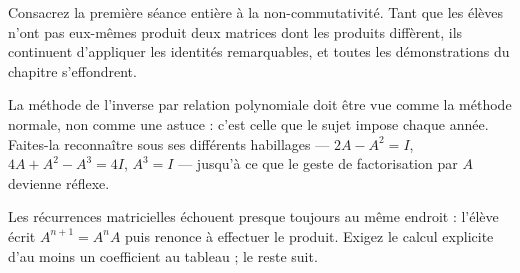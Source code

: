 \begin{notepourlaclasse}
Consacrez la première séance entière à la non-commutativité. Tant que les
élèves n'ont pas eux-mêmes produit deux matrices dont les produits diffèrent,
ils continuent d'appliquer les identités remarquables, et toutes les
démonstrations du chapitre s'effondrent.

La méthode de l'inverse par relation polynomiale doit être vue comme la
méthode normale, non comme une astuce : c'est celle que le sujet impose chaque
année. Faites-la reconnaître sous ses différents habillages —
$2A-A^{2} = I$, $4A+A^{2}-A^{3} = 4I$, $A^{3} = I$ — jusqu'à ce que le geste
de factorisation par $A$ devienne réflexe.

Les récurrences matricielles échouent presque toujours au même endroit :
l'élève écrit $A^{n+1} = A^{n}A$ puis renonce à effectuer le produit. Exigez
le calcul explicite d'au moins un coefficient au tableau ; le reste suit.
\end{notepourlaclasse}
